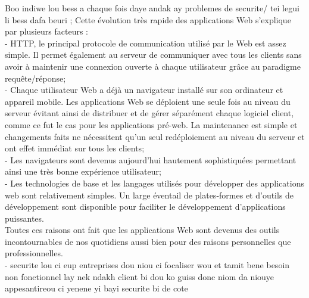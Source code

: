 Boo indiwe lou bess a chaque fois daye andak ay problemes de securite/ tei legui li bess dafa beuri ;
Cette évolution très rapide des applications Web s'explique par plusieurs facteurs : \\
- HTTP, le principal protocole de communication utilisé par le Web est assez simple. Il permet également au serveur de communiquer avec tous les clients sans avoir à maintenir une connexion ouverte à chaque utilisateur grâce au paradigme requête/réponse;\\
- Chaque utilisateur Web a déjà un navigateur installé sur son ordinateur et appareil mobile. Les applications Web se déploient une seule fois au niveau du serveur évitant ainsi de distribuer et de gérer séparément chaque logiciel client, comme ce fut le cas pour les applications pré-web. La maintenance est simple et changements faits ne nécessitent qu'un seul redéploiement au niveau du serveur et ont effet immédiat sur tous les clients;\\
- Les navigateurs sont devenus aujourd'hui hautement sophistiquées permettant ainsi une très bonne expérience utilisateur;\\
- Les technologies de base et les langages utilisés pour développer des applications web sont relativement simples. Un large éventail de plates-formes et d'outils de développement sont disponible pour faciliter le développement d'applications puissantes.\\
Toutes ces raisons ont fait que les applications Web sont devenus des outils incontournables de nos quotidiens aussi bien pour des raisons personnelles que professionnelles.\\

- securite lou ci eup entreprises dou niou ci focaliser wou et tamit bene besoin non fonctionnel lay nek ndakh client bi dou ko guiss donc niom da niouye appesantireou ci yenene yi bayi securite bi de cote

